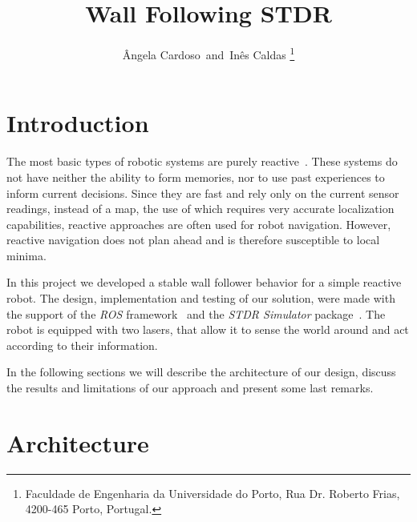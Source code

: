 \documentclass[10pt,journal,compsoc]{IEEEtran}
\begin{document}
\title{Wall Following STDR}
\author{\^{A}ngela Cardoso~and~In\^{e}s Caldas%
\thanks{Faculdade de Engenharia da Universidade do Porto, Rua Dr. Roberto Frias, 4200-465 Porto, Portugal.}}


\maketitle

\section{Introduction}
The most basic types of robotic systems are purely reactive~\cite{Reactive}. These systems do not have neither the ability to form memories, nor to use past experiences to inform current decisions. Since they are fast and rely only on the current sensor readings, instead of a map, the use of which requires very accurate localization capabilities, reactive approaches are often used for robot navigation. However, reactive navigation does not plan ahead and is therefore susceptible to local minima. 

In this project we developed a stable wall follower behavior for a simple reactive robot. The design, implementation and testing of our solution, were made with the support of the \textit{ROS} framework~\cite{ROS,AGITR} and the \textit{STDR Simulator} package~\cite{STDR}. The robot is equipped with two lasers, that allow it to sense the world around and act according to their information. 

In the following sections we will describe the architecture of our design, discuss the results and limitations of our approach and present some last remarks.


\section{Architecture}
\end{document}
